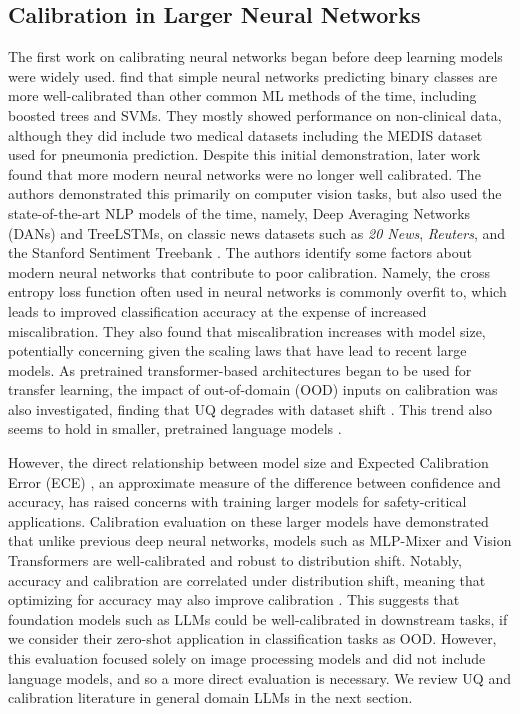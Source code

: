 \subsection{Calibration in Larger Neural Networks} 
The first work on calibrating neural networks began before deep learning models were widely used. \citet{niculescu-mizilPredictingGoodProbabilities2005} find that simple neural networks predicting binary classes are more well-calibrated than other common ML methods of the time, including boosted trees and SVMs. They mostly showed performance on non-clinical data, although they did include two medical datasets including the MEDIS dataset \citep{finePredictionRuleIdentify1997} used for pneumonia prediction. Despite this initial demonstration, later work found that more modern neural networks were no longer well calibrated. The authors demonstrated this primarily on computer vision tasks, but also used the state-of-the-art NLP models of the time, namely, Deep Averaging Networks (DANs) and TreeLSTMs, on classic news datasets such as \emph{20 News}, \emph{Reuters}, and the Stanford Sentiment Treebank \citep{guoCalibrationModernNeural2017}. The authors identify some factors about modern neural networks that contribute to poor calibration. Namely, the cross entropy loss function often used in neural networks is commonly overfit to, which leads to improved classification accuracy at the expense of increased miscalibration. They also found that miscalibration increases with model size, potentially concerning given the scaling laws that have lead to recent large models. As pretrained transformer-based architectures began to be used for transfer learning, the impact of out-of-domain (OOD) inputs on calibration was also investigated, finding that UQ degrades with dataset shift \citep{ovadiaCanYouTrust2019}. This trend also seems to hold in smaller, pretrained language models \citep{desaiCalibrationPretrainedTransformers2020}.

However, the direct relationship between model size and Expected Calibration Error (ECE) \citep{naeiniObtainingWellCalibrated2015}, an approximate measure of the difference between confidence and accuracy, has raised concerns with training larger models for safety-critical applications. Calibration evaluation on these larger models have demonstrated that unlike previous deep neural networks, models such as MLP-Mixer \citep{tolstikhinMLPMixerAllMLPArchitecture2021}
and Vision Transformers \citep{dosovitskiyImageWorth16x162021} are well-calibrated and robust to distribution shift. Notably, accuracy and calibration are correlated under distribution shift, meaning that optimizing for accuracy may also improve calibration \cite{mindererRevisitingCalibrationModern2021}. This suggests that foundation models such as LLMs could be well-calibrated in downstream tasks, if we consider their zero-shot application in classification tasks as OOD. However, this evaluation focused solely on image processing models and did not include language models, and so a more direct evaluation is necessary. We review UQ and calibration literature in general domain LLMs in the next section.

